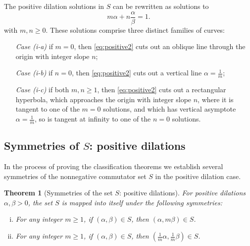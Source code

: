 \documentclass[11pt, letterpaper, reqno]{amsart}
\newtheorem{thm}{Theorem}[section]
\theoremstyle{definition}
\numberwithin{equation}{section}
\begin{document}
The positive dilation solutions  in  $S$ can be rewritten as  solutions to
\begin{equation}
\label{eq:positive2}
m \alpha +n \frac{\alpha}{\beta} =1.
\end{equation}
with $m, n\ge 0$. %
These solutions comprise three distinct families of curves:
\begin{enumerate}
\item[{\em Case (i-a)}] 
if $m = 0$, then
  \eqref{eq:positive2} cuts out  an oblique line through the origin with integer slope $n$; 
 \item[{\em Case (i-b)}] 
 if $n = 0$, 
 then \eqref{eq:positive2} cuts out  a vertical line  $\alpha=\frac{1}{m}$; 
\item[{\em Case (i-c)}] 
if both $m ,n\geq 1$, then \eqref{eq:positive2}
cuts out a rectangular hyperbola,
which approaches the origin with integer slope $n$,
where it is tangent to one of the $m=0$ solutions,
and which has  vertical asymptote $\alpha= \frac{1}{m}$,
so is tangent at infinity to one of the $n = 0$ solutions.
\end{enumerate}


%
%

\subsection{Symmetries of $S$: positive dilations} 

In the process of proving the classification theorems we 
establish several symmetries of the nonnegative commutator set $S$ in the positive dilation case.

%
%
\begin{thm}[Symmetries of the set $S$: positive dilations]
\label{thm:symmetries-p}
For positive dilations $\alpha, \beta >0$, the set $S$ is mapped into itself under the following symmetries:
\begin{enumerate}[(i)]
\item For any integer $m \ge 1$, if $(\alpha, \beta) \in S$, then $(\alpha, m\beta) \in S$.
\item For any integer $m \ge 1$, if $(\alpha, \beta) \in S$, then $(\frac{1}{m}\alpha, \frac{1}{m}\beta) \in S$.
\end{enumerate}
\end{thm}
\end{document}

